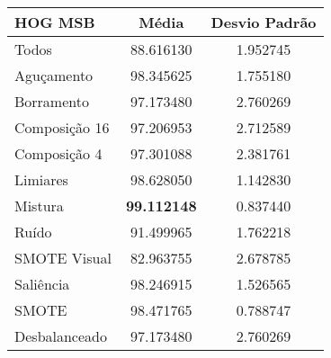 \begin{table}[!htbp]
\centering
\caption{}
\label{tab:resultados:x:melhor}
\begin{tabular}{|l|c|c|}
\hline
\textbf{HOG MSB} & \textbf{Média}     & \textbf{Desvio Padrão} \\ \hline
   Todos        &  88.616130 &  1.952745  \\ \hline
  Aguçamento    &  98.345625 &  1.755180  \\ \hline
  Borramento    &  97.173480 &  2.760269  \\ \hline
  Composição 16 &  97.206953 &  2.712589  \\ \hline
  Composição 4  &  97.301088 &  2.381761  \\ \hline
  Limiares      &  98.628050 &  1.142830  \\ \hline
  Mistura       &  \textbf{99.112148} &  0.837440  \\ \hline
  Ruído         &  91.499965 &  1.762218  \\ \hline
  SMOTE Visual  &  82.963755 &  2.678785  \\ \hline
  Saliência     &  98.246915 &  1.526565  \\ \hline
 SMOTE          &  98.471765 &  0.788747  \\ \hline
Desbalanceado   &  97.173480 &  2.760269  \\ \hline
\end{tabular}
\end{table}



